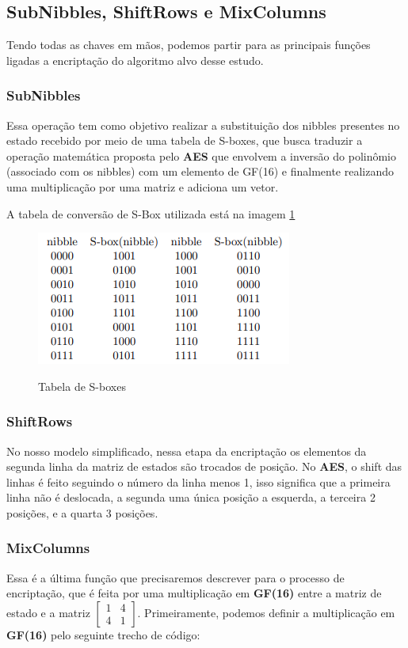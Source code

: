 \documentclass[12pt]{article}
\begin{document}
\subsection{SubNibbles, ShiftRows e MixColumns}
Tendo todas as chaves em mãos, podemos partir para as principais funções ligadas a encriptação do algoritmo alvo desse estudo.

\subsubsection{SubNibbles}
Essa operação tem como objetivo realizar a substituição dos nibbles presentes no estado recebido por meio de uma tabela de S-boxes, que busca traduzir a operação matemática proposta pelo \textbf{AES} que envolvem a inversão do polinômio (associado com os nibbles) com um elemento de GF(16) e finalmente realizando uma multiplicação por uma matriz e adiciona um vetor.

A tabela de conversão de S-Box utilizada está na imagem \ref{fig:S-Boxes} 
\begin{figure}[h]
    \caption{Tabela de S-boxes}
    \centering
    \includegraphics[width = 0.6\linewidth]{Imagens/S-Boxes.png}  
    \label{fig:S-Boxes}
\end{figure}

\subsubsection{ShiftRows}
No nosso modelo simplificado, nessa etapa da encriptação os elementos da segunda linha da matriz de estados são trocados de posição. No \textbf{AES}, o shift das linhas é feito seguindo o número da linha menos 1, isso significa que a primeira linha não é deslocada, a segunda uma única posição a esquerda, a terceira 2 posições, e a quarta 3 posições.

\subsubsection{MixColumns}
Essa é a última função que precisaremos descrever para o processo de encriptação, que é feita por uma multiplicação em \textbf{GF(16)} entre a matriz de estado e a matriz $
\begin{bmatrix}
  1 & 4 \\
  4 & 1
\end{bmatrix}$. Primeiramente, podemos definir a multiplicação	em \textbf{GF(16)} pelo seguinte trecho de código:
\end{document}
